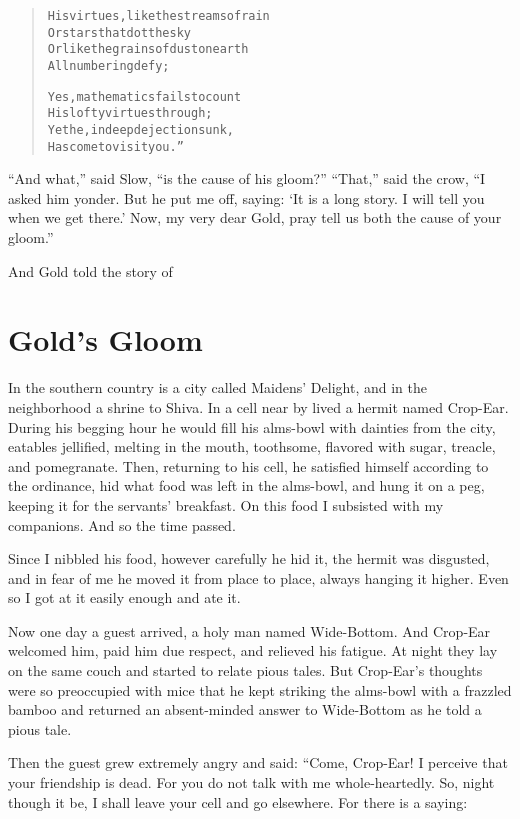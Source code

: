 \documentclass[article, twoside, 14pt]{memoir}
\renewenvironment{verbatim}{%
\begin{quote}%
\vskip -10pt%
\begin{alltt}\normalfont\large}{\end{alltt}%
\end{quote}%
\vskip -10pt
} %
\begin{document}
\begin{verbatim}
His virtues, like the streams of rain
    Or stars that dot the sky
Or like the grains of dust on earth
    All numbering defy;

Yes, mathematics fails to count
    His lofty virtues through;
Yet he, in deep dejection sunk,
    Has come to visit you.”
\end{verbatim}
``And what,'' said Slow, ``is the cause of his gloom?'' ``That,''
said the crow,
``I asked him yonder. But he put me off, saying: `It is a long story. I will tell you when we get there.' Now, my very dear Gold, pray tell us both the cause of your gloom.''

And Gold told the story of

\chapter{Gold's Gloom}

\label{s38}

In the southern country is a city called Maidens' Delight, and in
the neighborhood a shrine to Shiva. In a cell near by lived a
hermit named Crop-Ear. During his begging hour he would fill his
alms-bowl with dainties from the city, eatables jellified, melting
 in the mouth, toothsome, flavored with sugar, treacle, and
pomegranate. Then, returning to his cell, he satisfied himself
according to the ordinance, hid what food was left in the
alms-bowl, and hung it on a peg, keeping it for the servants'
breakfast. On this food I subsisted with my companions. And so the
time passed.

Since I nibbled his food, however carefully he hid it, the hermit
was disgusted, and in fear of me he moved it from place to place,
always hanging it higher. Even so I got at it easily enough and ate
it.

Now one day a guest arrived, a holy man named Wide-Bottom. And
Crop-Ear welcomed him, paid him due respect, and relieved his
fatigue. At night they lay on the same couch and started to relate
pious tales. But Crop-Ear's thoughts were so preoccupied with mice
that he kept striking the alms-bowl with a frazzled bamboo and
returned an absent-minded answer to Wide-Bottom as he told a pious
tale.

Then the guest grew extremely angry and said: “Come, Crop-Ear! I
perceive that your friendship is dead. For you do not talk with me
whole-heartedly. So, night though it be, I shall leave your cell
and go elsewhere. For there is a saying:
\end{document}
